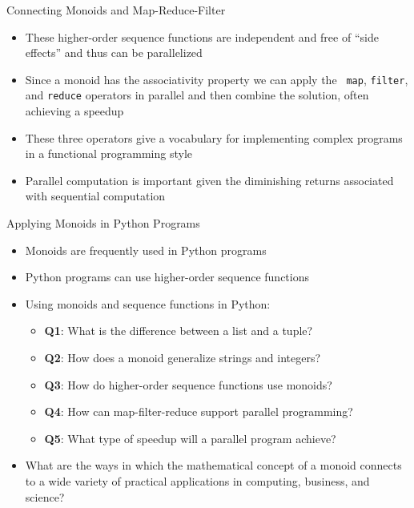 \documentclass[14pt,aspectratio=169]{beamer}
\begin{document}
%
\begin{frame}{Connecting Monoids and Map-Reduce-Filter}
  \begin{itemize}
    \item These higher-order sequence functions are independent and free of
      ``side effects'' and thus can be parallelized
      \vspace*{-.15in}
    \item Since a monoid has the associativity property we can apply the {\tt
      map}, {\tt filter}, and {\tt reduce} operators in parallel and then
      combine the solution, often achieving a speedup
      \vspace*{-.15in}
    \item These three operators give a vocabulary for implementing complex
      programs in a functional programming style
      \vspace*{-.15in}
    \item Parallel computation is important given the diminishing
      returns associated with sequential computation
  \end{itemize}
\end{frame}

%
\begin{frame}{Applying Monoids in Python Programs}
  \begin{itemize}
    \item Monoids are frequently used in Python programs
      \vspace*{-.2in}
    \item Python programs can use higher-order sequence functions
      \vspace*{-.2in}
    \item Using monoids and sequence functions in Python:
      \begin{itemize}
        \item {\bf Q1}: What is the difference between a list and a tuple?
        \item {\bf Q2}: How does a monoid generalize strings and integers?
        \item {\bf Q3}: How do higher-order sequence functions use monoids?
        \item {\bf Q4}: How can map-filter-reduce support parallel programming?
        \item {\bf Q5}: What type of speedup will a parallel program achieve?
      \end{itemize}
      \vspace*{-.2in}
    \item What are the ways in which the mathematical concept of a monoid
      connects to a wide variety of practical applications in computing,
      business, and science?
  \end{itemize}
\end{frame}
\end{document}
